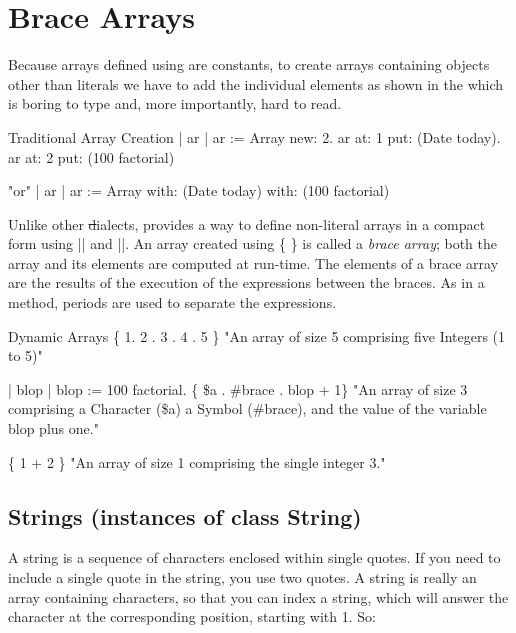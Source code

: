 \documentclass[a4paper,10pt,twoside]{book}
\begin{document}
\section{Brace Arrays}
Because arrays defined using \ct{#()} are constants, 
to create arrays containing objects other than literals we have to add the individual elements as shown in the  which is boring to type and, more importantly, hard to read. 

\begin{script}{Traditional Array Creation}
| ar | 
ar := Array new: 2. 
ar at: 1 put: (Date today).
ar at: 2 put: (100 factorial)

"or"
| ar | 
ar := Array with: (Date today) with: (100 factorial)
\end{script}

Unlike other \st dialects, \sq  provides a way to define non-literal arrays in a compact form using \index{\{\}} \ct|{| and \ct|}|. An array created using \{ \} is called a  \textit{brace array}; both the array and its elements are computed at run-time. The elements of a brace array are the results of the execution of the expressions between the braces.
As in a method, periods are used to separate the expressions. 

\begin{script}{Dynamic Arrays}
\{ 1. 2 . 3 . 4 . 5 \} 
"An array of size 5 comprising five Integers (1 to 5)"

| blop |
blop := 100 factorial. 
\{ \$a . #brace . blop + 1\} 
"An array of size 3 comprising a Character (\$a) a Symbol (#brace),
 and the value of the variable blop plus one."

\{ 1 + 2 \} "An array of size 1 comprising the single integer 3."
\end{script}


\subsection{Strings (instances of class String)}
A  string is a sequence of characters enclosed within  single quotes. 
If you need to include a single quote in the string, you use two quotes.
A string is really an array containing characters, so that you can index a string, which will answer the character at the corresponding position, starting with 1. 
So:
\end{document}
